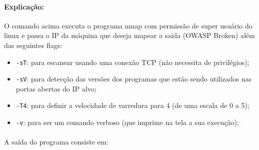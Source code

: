 \documentclass[12pt]{article}
\begin{document}
\paragraph{Explicação:}

O comando acima executa o programa nmap com permissão de super usuário do linux e passa o IP da máquina que deseja mapear a saída (OWASP Broken) além das seguintes flags:

\begin{itemize}
  \item \texttt{-sT}: para escanear usando uma conexão TCP (não necessita de privilégios);
  \item \texttt{-sV}: para detecção das versões dos programas que estão sendo utilizados nas portas abertas do IP alvo;
  \item \texttt{-T4}: para definir a velocidade de varredura para 4 (de uma escala de 0 a 5);
  \item \texttt{-v}: para ser um comando verboso (que imprime na tela a sua execução);
\end{itemize}

\paragraph{}

A saída do programa consiste em:
\end{document}

